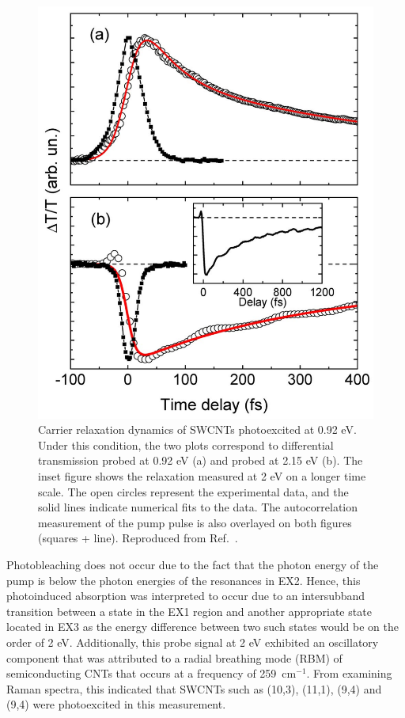 \begin{figure}[ht]
	\centering
	\includegraphics[scale=0.25]{images/chapter_prior_works/e11_pump_probe_manzoni}
	\caption{Carrier relaxation dynamics of SWCNTs photoexcited at 0.92 eV. Under this condition, the two plots correspond to differential transmission probed at 0.92 eV (a) and probed at 2.15 eV (b). The inset figure shows the relaxation measured at 2 eV on a longer time scale. The open circles represent the experimental data, and the solid lines indicate numerical fits to the data. The autocorrelation measurement of the pump pulse is also overlayed on both figures (squares + line). Reproduced from Ref.\ \cite{manzoni2005intersubband}.}
	\label{fig:e11_pump_manzoni}
\end{figure}

Photobleaching does not occur due to the fact that the photon energy of the pump is below the photon energies of the resonances in EX2. Hence, this photoinduced absorption was interpreted to occur due to an intersubband transition between a state in the EX1 region and another appropriate state located in EX3 as the energy difference between two such states would be on the order of 2 eV. Additionally, this probe signal at 2 eV exhibited an oscillatory component that was attributed to a radial breathing mode (RBM) of semiconducting CNTs that occurs at a frequency of 259~$\text{cm}^{-1}$. From examining Raman spectra, this indicated that SWCNTs such as (10,3), (11,1), (9,4) and (9,4) were photoexcited in this measurement.

